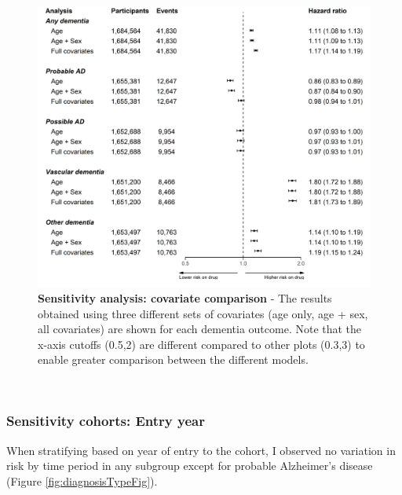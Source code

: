 \documentclass[a4paper, twoside]{templates/ociamthesis}
\begin{document}
~





\begin{figure}[H]
\includegraphics[width=1\linewidth]{figures/cprd-analysis/forester_unadjusted} \caption[Sensitivity analysis: covariate comparison]{\textbf{Sensitivity analysis: covariate comparison} - The results obtained using three different sets of covariates (age only, age + sex, all covariates) are shown for each dementia outcome. Note that the x-axis cutoffs (0.5,2) are different compared to other plots (0.3,3) to enable greater comparison between the different models.}\label{fig:unadjustedComparisonFig}
\end{figure}

~

\hypertarget{sensitivity-cohorts-entry-year}{%
\subsubsection{Sensitivity cohorts: Entry year}\label{sensitivity-cohorts-entry-year}}

When stratifying based on year of entry to the cohort, I observed no variation in risk by time period in any subgroup except for probable Alzheimer's disease (Figure \ref{fig:diagnosisTypeFig}).

~
\end{document}
